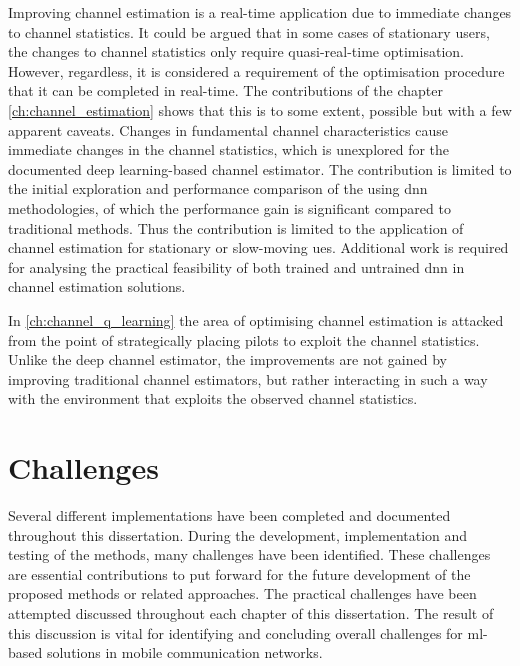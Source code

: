 Improving channel estimation is a real-time application due to immediate changes to channel statistics. It could be argued that in some cases of stationary users, the changes to channel statistics only require quasi-real-time optimisation. However, regardless, it is considered a requirement of the optimisation procedure that it can be completed in real-time. The contributions of the chapter \ref{ch:channel_estimation} shows that this is to some extent, possible but with a few apparent caveats. Changes in fundamental channel characteristics cause immediate changes in the channel statistics, which is unexplored for the documented deep learning-based channel estimator. The contribution is limited to the initial exploration and performance comparison of the using \gls{dnn} methodologies, of which the performance gain is significant compared to traditional methods. Thus the contribution is limited to the application of channel estimation for stationary or slow-moving \glspl{ue}. Additional work is required for analysing the practical feasibility of both trained and untrained \gls{dnn} in channel estimation solutions.

In \ref{ch:channel_q_learning} the area of optimising channel estimation is attacked from the point of strategically placing pilots to exploit the channel statistics. Unlike the deep channel estimator, the improvements are not gained by improving traditional channel estimators, but rather interacting in such a way with the environment that exploits the observed channel statistics. 


\section{Challenges}
Several different implementations have been completed and documented throughout this dissertation. During the development, implementation and testing of the methods, many challenges have been identified. These challenges are essential contributions to put forward for the future development of the proposed methods or related approaches. The practical challenges have been attempted discussed throughout each chapter of this dissertation. The result of this discussion is vital for identifying and concluding overall challenges for \gls{ml}-based solutions in mobile communication networks.


